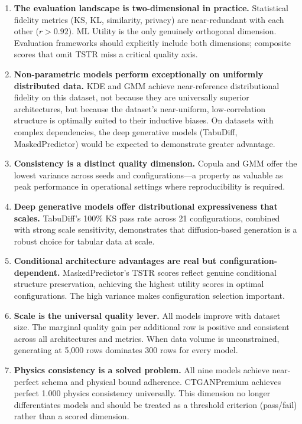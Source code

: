 \documentclass[11pt, a4paper]{report}
\begin{document}
\begin{enumerate}[leftmargin=*, itemsep=8pt]

\item \textbf{The evaluation landscape is two-dimensional in practice.}
Statistical fidelity metrics (KS, KL, similarity, privacy) are near-redundant with each other ($r > 0.92$). ML Utility is the only genuinely orthogonal dimension. Evaluation frameworks should explicitly include both dimensions; composite scores that omit TSTR miss a critical quality axis.

\item \textbf{Non-parametric models perform exceptionally on uniformly distributed data.}
KDE and GMM achieve near-reference distributional fidelity on this dataset, not because they are universally superior architectures, but because the dataset's near-uniform, low-correlation structure is optimally suited to their inductive biases. On datasets with complex dependencies, the deep generative models (TabuDiff, MaskedPredictor) would be expected to demonstrate greater advantage.

\item \textbf{Consistency is a distinct quality dimension.}
Copula and GMM offer the lowest variance across seeds and configurations---a property as valuable as peak performance in operational settings where reproducibility is required.

\item \textbf{Deep generative models offer distributional expressiveness that scales.}
TabuDiff's 100\% KS pass rate across 21 configurations, combined with strong scale sensitivity, demonstrates that diffusion-based generation is a robust choice for tabular data at scale.

\item \textbf{Conditional architecture advantages are real but configuration-dependent.}
MaskedPredictor's TSTR scores reflect genuine conditional structure preservation, achieving the highest utility scores in optimal configurations. The high variance makes configuration selection important.

\item \textbf{Scale is the universal quality lever.}
All models improve with dataset size. The marginal quality gain per additional row is positive and consistent across all architectures and metrics. When data volume is unconstrained, generating at 5{,}000 rows dominates 300 rows for every model.

\item \textbf{Physics consistency is a solved problem.}
All nine models achieve near-perfect schema and physical bound adherence. CTGANPremium achieves perfect 1.000 physics consistency universally. This dimension no longer differentiates models and should be treated as a threshold criterion (pass/fail) rather than a scored dimension.

\end{enumerate}
\end{document}
